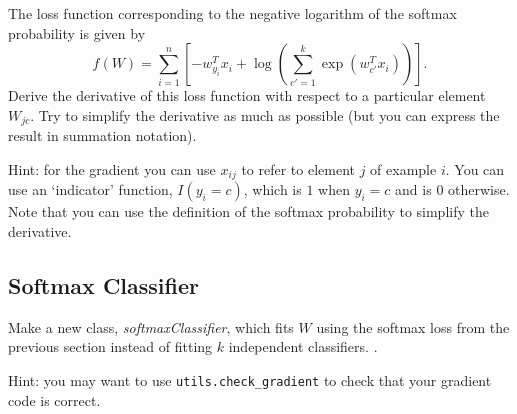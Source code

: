 \documentclass{article}
\begin{document}
The loss function corresponding to the negative logarithm of the softmax probability is given by
\[
f(W) = \sum_{i=1}^n \left[-w_{y_i}^Tx_i + \log\left(\sum_{c' = 1}^k \exp(w_{c'}^Tx_i)\right)\right].
\]
Derive the derivative of this loss function with respect to a particular element $W_{jc}$. Try to simplify the derivative as much as possible (but you can express the result in summation notation).

Hint: for the gradient you can use $x_{ij}$ to refer to element $j$ of example $i$. You can use an `indicator' function, $I(y_i = c)$, which is $1$ when $y_i = c$ and is $0$ otherwise. Note that you can use the definition of the softmax probability to simplify the derivative.



\red{
$\frac{d}{dW_{jc}}[-\log(p(y_i|W,x_i)=-I(y_i = c)(x_i)_j+\frac{\exp(w_(c')^Tx_i)}{(\sum_{c'=1}^k\exp(w_{c'}^Tx_i))}(x_i)_j$}


\subsection{Softmax Classifier}

Make a new class, \emph{softmaxClassifier}, which fits $W$ using the softmax loss from the previous section  instead of fitting $k$ independent classifiers. .

Hint: you may want to use \verb|utils.check_gradient| to check that your gradient code is correct. \\

\end{document}
